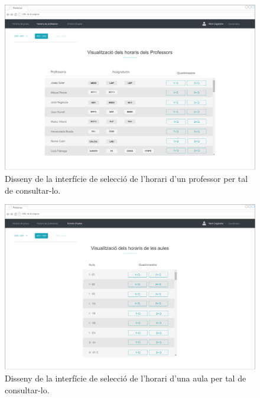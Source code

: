 \documentclass[a4paper,12pt]{ThesisStyle}
\begin{document}
\begin{figure}[H]
	\centering
	\includegraphics[width=\textwidth]{assets/interfaces/coordinadors/horarisProfessors/main.pdf}
	\caption{\label{img:horarisProfessors_main}Disseny de la interfície de selecció de l'horari d'un professor per tal de consultar-lo.}
\end{figure}

\begin{figure}[H]
	\centering
	\includegraphics[width=\textwidth]{assets/interfaces/coordinadors/horarisAules/main.pdf}
	\caption{\label{img:horarisAules_main}Disseny de la interfície de selecció de l'horari d'una aula per tal de consultar-lo.}
\end{figure}
\end{document}
